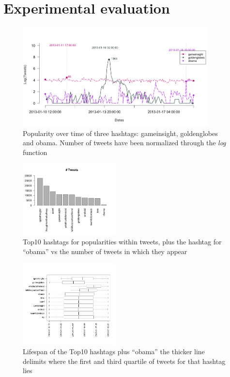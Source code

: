 \section{Experimental evaluation}
\label{sec:results}
\begin{figure}[!Ht]
\includegraphics[width=0.9\textwidth]{images/3-plots.png} 
\caption{Popularity over time of three hashtags: gameinsight, goldenglobes and obama. Number of tweets have been normalized through the \emph{log} function}
\label{fig:trends}
\end{figure}

\begin{figure}[!ht]
\includegraphics[width=0.45\textwidth]{images/hashtag-tweets-hist_20.png} 
\caption{Top10 hashtags for popularities within tweets, plus the hashtag for ``obama'' vs the number of tweets in which they appear}
\label{fig:tweets-hist}
\end{figure}

\begin{figure}[!ht]
\includegraphics[width=0.45\textwidth]{images/hashtags-timewindow.png} 
\caption{Lifespan of the Top10 hashtags plus ``obama'' the thicker line delimits where the first and third quartile of tweets for that hashtag lies}
\label{fig:tweets-lifespan}
\end{figure}


